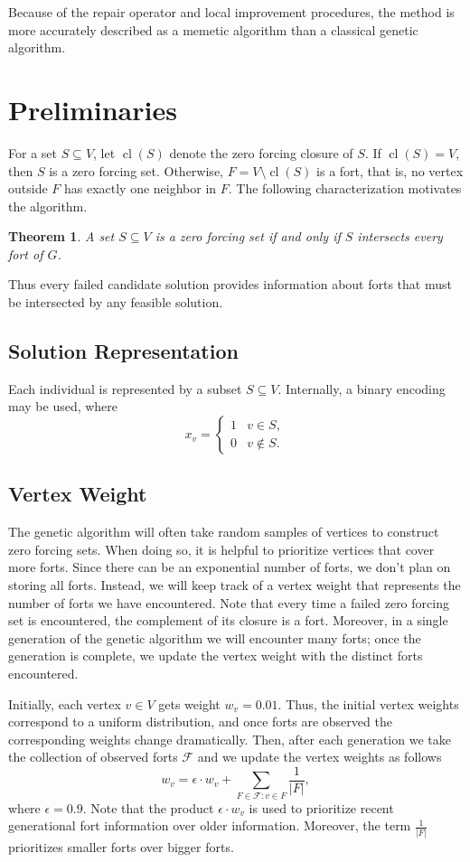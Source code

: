 \documentclass[11pt]{article}
\newtheorem{theorem}{Theorem}
\newcommand\abs[1]{\left|#1\right|}
\newcommand\cl[1]{\operatorname{cl}\left(#1\right)}
\begin{document}
Because of the repair operator and local improvement procedures,
the method is more accurately described as a memetic algorithm
than a classical genetic algorithm.

\section{Preliminaries}
For a set $S \subseteq V$, let $\cl{S}$ denote the zero forcing closure of $S$.
If $\cl{S}=V$, then $S$ is a zero forcing set.
Otherwise, $F=V\setminus\cl{S}$ is a fort, that is, no vertex outside $F$ has exactly one neighbor in $F$.
The following characterization motivates the algorithm.

\begin{theorem}
A set $S \subseteq V$ is a zero forcing set if and only if
$S$ intersects every fort of $G$.
\end{theorem}

Thus every failed candidate solution provides information about
forts that must be intersected by any feasible solution.

\subsection{Solution Representation}
Each individual is represented by a subset $S \subseteq V$.
Internally, a binary encoding may be used, where
\[
x_v =
\begin{cases}
1 & v \in S,\\
0 & v \notin S.
\end{cases}
\]

\subsection{Vertex Weight}
The genetic algorithm will often take random samples of vertices to construct zero forcing sets.
When doing so, it is helpful to prioritize vertices that cover more forts.
Since there can be an exponential number of forts, we don't plan on storing all forts.
Instead, we will keep track of a vertex weight that represents the number of forts we have encountered.
Note that every time a failed zero forcing set is encountered, the complement of its closure is a fort. 
Moreover, in a single generation of the genetic algorithm we will encounter many forts; once the generation is complete, we update the vertex weight with the distinct forts encountered. 

Initially, each vertex $v\in V$ gets weight $w_{v}=0.01$.
Thus, the initial vertex weights correspond to a uniform distribution, and once forts are observed the corresponding weights change dramatically. 
Then, after each generation we take the collection of observed forts $\mathcal{F}$ and we update the vertex weights as follows
\[
w_{v} = \epsilon\cdot w_{v} + \sum_{F\in\mathcal{F}\colon v\in F}\frac{1}{\abs{F}},
\]
where $\epsilon=0.9$.
Note that the product $\epsilon\cdot w_{v}$ is used to prioritize recent generational fort information over older information.
Moreover, the term $\frac{1}{\abs{F}}$ prioritizes smaller forts over bigger forts. 
\end{document}

